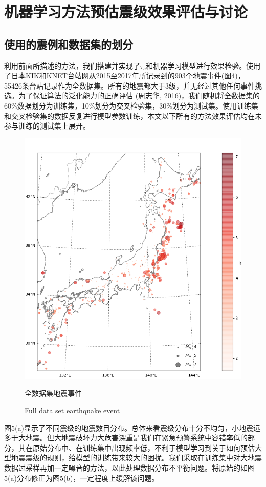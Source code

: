 \chapter{机器学习方法预估震级效果评估与讨论 }
\section{使用的震例和数据集的划分}
\indent 利用前面所描述的方法，我们搭建并实现了$\tau_{c}$和机器学习模型进行效果检验。使用了日本KIK和KNET台站网从2015至2017年所记录到的903个地震事件(图4)，55426条台站记录作为全数据集。所有的地震都大于3级，并无经过其他任何事件挑选。为了保证算法的泛化能力的正确评估 (周志华, 2016)，我们随机将全数据集的60\%数据划分为训练集，10\%划分为交叉检验集，30\%划分为测试集。使用训练集和交叉检验集的数据反复进行模型参数训练，本文以下所有的方法效果评估均在未参与训练的测试集上展开。\\
\begin{figure}[!h] 
\centering 
 \includegraphics[width=0.8\linewidth]{img/basemap.jpg} 
 \renewcommand{\figurename}{图} 
\caption{全数据集地震事件} 
\addtocounter{figure}{-1} \vspace{-5pt} 
\renewcommand{\figurename}{Fig} 
\caption{Full data set earthquake event} 
\renewcommand{\figurename}{图} 
\label{fig:network-device-influence.png} 
\end{figure}
\indent 图5(a)显示了不同震级的地震数目分布。总体来看震级分布十分不均匀，小地震远多于大地震。但大地震破坏力大危害深重是我们在紧急预警系统中容错率低的部分，其在原始分布中、在训练集中出现频率低，不利于模型学习到关于如何预估大型地震震级的规则，给模型的训练带来较大的困扰。我们采取在训练集中对大地震数据过采样再加一定噪音的方法，以此处理数据分布不平衡问题。将原始的如图5(a)分布修正为图5(b)，一定程度上缓解该问题。\\
